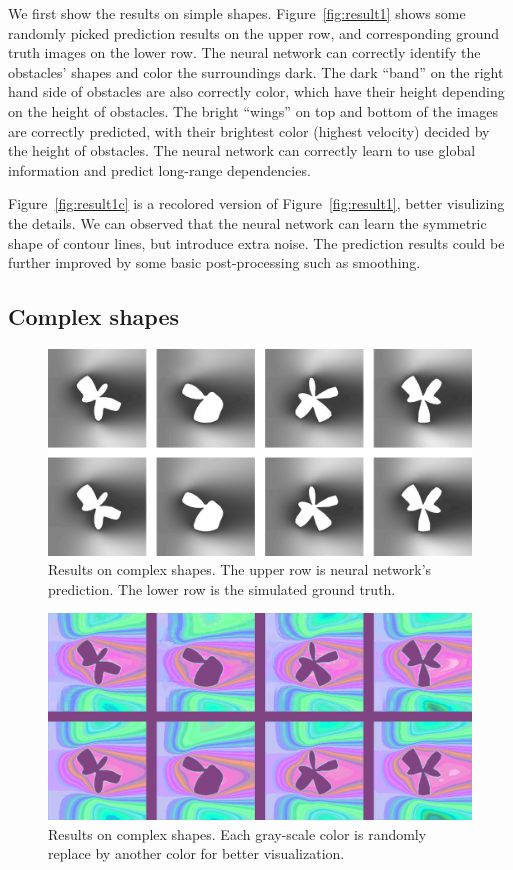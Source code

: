 \documentclass[12pt]{article}
\begin{document}
We first show the results on simple shapes. Figure~\ref{fig:result1} shows some randomly picked prediction results on the upper row, and corresponding ground truth images on the lower row. 
The neural network can correctly identify the obstacles' shapes and color the surroundings dark. 
The dark ``band'' on the right hand side of obstacles are also correctly color, which have their height depending on the height of obstacles.
The bright ``wings'' on top and bottom of the images are correctly predicted, with their brightest color (highest velocity) decided by the height of obstacles.
The neural network can correctly learn to use global information and predict long-range dependencies.

Figure~\ref{fig:result1c} is a recolored version of Figure~\ref{fig:result1}, better visulizing the details.
We can observed that the neural network can learn the symmetric shape of contour lines, but introduce extra noise.
The prediction results could be further improved by some basic post-processing such as smoothing.

\subsection{Complex shapes}
\begin{figure}[p]
 \centering
 \includegraphics[width=\textwidth]{result2.png}
 \caption{Results on complex shapes. The upper row is neural network's 
prediction. The lower row is the simulated ground truth.}
 \label{fig:result2}
\end{figure}

\begin{figure}[p]
 \centering
 \includegraphics[width=\textwidth]{result2-color.png}
 \caption{Results on complex shapes. Each gray-scale color is randomly 
 replace by another color for better visualization.}
 \label{fig:result2c}
\end{figure}
\end{document}
